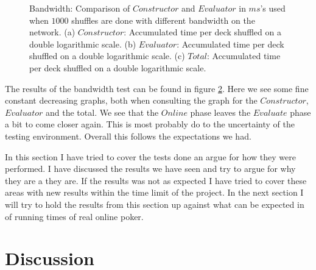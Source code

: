 \documentclass[twoside,11pt,openright]{report}
\begin{document}
\begin{figure}
    \begin{subfigure}{\textwidth}
        \centering
        \caption{}
        \label{fig:total_bandwith_plot}
    \end{subfigure}
    \caption{Bandwidth: Comparison of $Constructor$ and $Evaluator$ in $ms$'s used when $1000$ shuffles are done with different bandwidth on the network. (a) $Constructor$: Accumulated time per deck shuffled on a double logarithmic scale. (b) $Evaluator$: Accumulated time per deck shuffled on a double logarithmic scale. (c) $Total$: Accumulated time per deck shuffled on a double logarithmic scale.}
    \label{fig:mesurement_bandwith}
\end{figure}

The results of the bandwidth test can be found in figure \ref{fig:mesurement_bandwith}. Here we see some fine constant decreasing graphs, both when consulting the graph for the $Constructor$, $Evaluator$ and the total. We see that the $Online$ phase leaves the $Evaluate$ phase a bit to come closer again. This is most probably do to the uncertainty of the testing environment. Overall this follows the expectations we had.

\bigskip

In this section I have tried to cover the tests done an argue for how they were performed. I have discussed the results we have seen and try to argue for why they are a they are. If the results was not as expected I have tried to cover these areas with new results within the time limit of the project. In the next section I will try to hold the results from this section up against what can be expected in of running times of real online poker.

\section{Discussion}
\label{sec:discussion}
\end{document}
